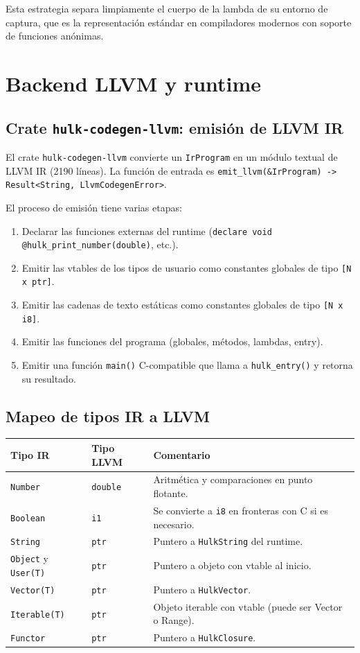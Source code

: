 \documentclass[12pt,letterpaper]{article}
\newcommand{\src}[1]{\texttt{#1}}
\begin{document}
Esta estrategia separa limpiamente el cuerpo de la lambda de su entorno de captura, que es la representación estándar en compiladores modernos con soporte de funciones anónimas.

\section{Backend LLVM y runtime}

\subsection{Crate \src{hulk-codegen-llvm}: emisión de LLVM IR}

El crate \src{hulk-codegen-llvm} convierte un \src{IrProgram} en un módulo textual de LLVM IR (2190 líneas). La función de entrada es \src{emit\_llvm(\&IrProgram) -> Result<String, LlvmCodegenError>}.

El proceso de emisión tiene varias etapas:
\begin{enumerate}[label=\arabic*.]
    \item Declarar las funciones externas del runtime (\src{declare void @hulk\_print\_number(double)}, etc.).
    \item Emitir las vtables de los tipos de usuario como constantes globales de tipo \src{[N x ptr]}.
    \item Emitir las cadenas de texto estáticas como constantes globales de tipo \src{[N x i8]}.
    \item Emitir las funciones del programa (globales, métodos, lambdas, entry).
    \item Emitir una función \src{main()} C-compatible que llama a \src{hulk\_entry()} y retorna su resultado.
\end{enumerate}

\subsection{Mapeo de tipos IR a LLVM}

\begin{longtable}{p{4cm}p{4cm}p{6cm}}
\toprule
\textbf{Tipo IR} & \textbf{Tipo LLVM} & \textbf{Comentario} \\
\midrule
\src{Number} & \src{double} & Aritmética y comparaciones en punto flotante. \\
\src{Boolean} & \src{i1} & Se convierte a \src{i8} en fronteras con C si es necesario. \\
\src{String} & \src{ptr} & Puntero a \src{HulkString} del runtime. \\
\src{Object} y \src{User(T)} & \src{ptr} & Puntero a objeto con vtable al inicio. \\
\src{Vector(T)} & \src{ptr} & Puntero a \src{HulkVector}. \\
\src{Iterable(T)} & \src{ptr} & Objeto iterable con vtable (puede ser Vector o Range). \\
\src{Functor} & \src{ptr} & Puntero a \src{HulkClosure}. \\
\bottomrule
\end{longtable}
\end{document}
